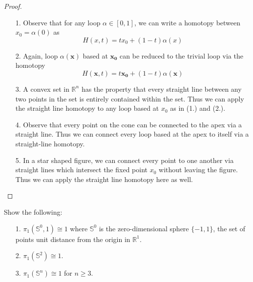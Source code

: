 \documentclass[a4paper,12pt,twoside]{hmcpset}
\begin{document}
\begin{proof}
    \begin{itemize}
        \item[1.] Observe that for any loop $\alpha \in [0,1]$, we
        can write a homotopy between $x_0 = \alpha(0)$ as 
        \[
            H(x, t) = tx_0 + (1 - t)\alpha(x)
        \]
        
        \item[2.] Again, loop $\alpha(\mathbf{x})$ based at $\mathbf{x_0}$ 
        can be reduced to the trivial loop via the homotopy
        \[
            H(\mathbf{x}, t) = t\mathbf{x_0} + (1 - t)\alpha(\mathbf{x})
        \]
        \item[3.] A convex set in $\mathbb{R}^n$ has the property that
        every straight line between any two points in the set is
        entirely contained within the set. Thus we can apply the
        straight line homotopy to any loop based at $x_0$ as in (1.)
        and (2.).
        
        \item[4.] Observe that every point on the cone can be
        connected to the apex via a straight line. Thus we can
        connect every loop based at the apex to itself via a
        straight-line homotopy.
        
        \item[5.] In a star shaped figure, we can connect every point
        to one another via straight lines which intersect the fixed
        point $x_0$ without leaving the figure. Thus we can apply the
        straight line homotopy here as well.
    \end{itemize}
\end{proof}

\begin{exercise}[Exercise 13.12]
Show the following:
\begin{itemize}
    \item[1.] $\pi_1(\mathbb{S}^0, 1) \cong 1$ where $\mathbb{S}^0$ is
    the zero-dimensional sphere $\{-1, 1\}$, the set of points unit
    distance from the origin in $\mathbb{R}^1$.
    \item[2.] $\pi_1(\mathbb{S}^2) \cong 1$.
    \item[3.] $\pi_1(\mathbb{S}^n) \cong 1$ for $n \ge 3$. 
\end{itemize}
\end{exercise}
\end{document}
